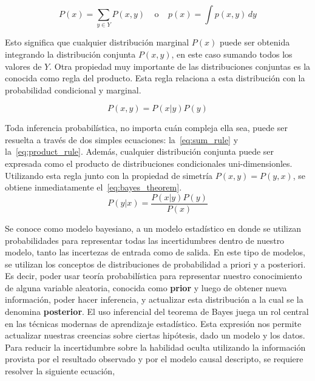 \documentclass[11pt,twoside,spanish]{report} %
\begin{document}
\begin{equation} \label{eq:sum_rule}
\tag{regla de la suma}
P(x) = \sum_{y \in Y} P(x,y) \ \ \ \ \ \text{o} \ \ \ \ \ p(x) = \int p(x,y) \, dy
\end{equation}

Esto significa que cualquier distribuci\'on marginal $P(x)$ puede ser obtenida integrando la distribuci\'on conjunta $P(x,y)$, en este caso sumando todos los valores de $Y$.
Otra propiedad muy importante de las distribuciones conjuntas es la conocida como regla del producto.
Esta regla relaciona a esta distribuci\'on con la probabilidad condicional y marginal.

\begin{equation}\label{eq:product_rule}
\tag{regla del producto}
P(x,y) = P(x|y) P(y)
\end{equation}

Toda inferencia probabil\'istica, no importa cu\'an compleja ella sea, puede ser resuelta a trav\'es de dos simples ecuaciones: la~\ref{eq:sum_rule} y la~\ref{eq:product_rule}.
Adem\'as, cualquier distribuci\'on conjunta puede ser expresada como el producto de distribuciones condicionales uni-dimensionles.
Utilizando esta regla junto con la propiedad de simetr\'ia $P(x,y) = P(y,x)$, se obtiene inmediatamente el~\ref{eq:bayes_theorem}.
%
\begin{equation}\label{eq:bayes_theorem}
\tag{teorema de Bayes}
P(y|x) = \frac{P(x|y)P(y)}{P(x)}
\end{equation}
%

Se conoce como modelo bayesiano, a un modelo estad\'istico en donde se utilizan probabilidades para representar todas las incertidumbres dentro de nuestro modelo, tanto las incertezas de entrada como de salida.
En este tipo de modelos, se utilizan los conceptos de distribuciones de probabilidad a priori y a posteriori.
Es decir, poder usar teor\'ia probabil\'istica para representar nuestro conocimiento de alguna variable aleatoria, conocida como \textbf{prior} y luego de obtener nueva informaci\'on, poder hacer inferencia, y actualizar esta distribuci\'on a la cual se la denomina \textbf{posterior}.
El uso inferencial del teorema de Bayes juega un rol central en las t\'ecnicas modernas de aprendizaje estad\'istico.
Esta expresi\'on nos permite actualizar nuestras creencias sobre ciertas hip\'otesis, dado un modelo y los datos.
Para reducir la incertidumbre sobre la habilidad oculta utilizando la informaci\'on provista por el resultado observado y por el modelo causal descripto, se requiere resolver la siguiente ecuaci\'on,
\end{document}
